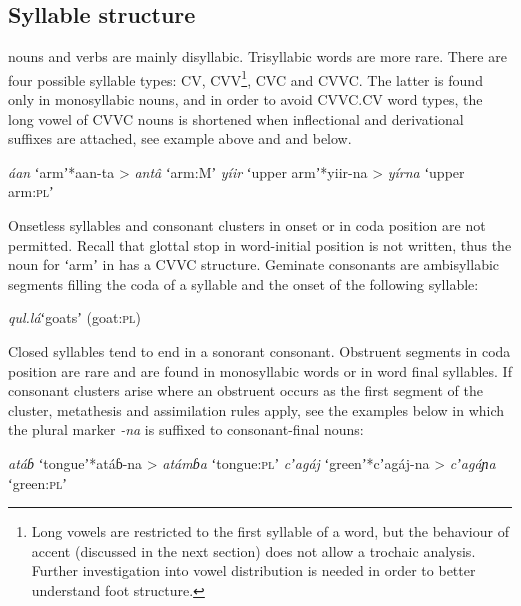 \documentclass[output=paper]{LSP/langsci}
\begin{document}
\subsection{Syllable structure} \label{sec:Petrollino:Syllablestructure}
 nouns and verbs are mainly disyllabic. Trisyllabic words are more rare. There are four possible syllable types: CV, CVV\footnote{Long vowels are restricted to the first syllable of a word, but the behaviour of accent (discussed in the next section) does not allow a trochaic analysis. Further investigation into vowel distribution is needed in order to better understand foot structure.}, CVC and CVVC. The latter is found only in monosyllabic nouns, and in order to avoid CVVC.CV word types, the long vowel of CVVC nouns is shortened when inflectional and derivational suffixes are attached, see example  above and  and  below.
\begin{exe}
	\ex \textit{áan}\hspace{9mm} ʻarmʼ\hspace{15mm}*aan-ta >\hspace{8mm} \textit{antâ}\hspace{8mm} ʻarm:Mʼ \label{ex:Petrollino:arm}
    \ex \textit{yíir}\hspace{9mm} ʻupper armʼ\hspace{5mm}*yiir-na >\hspace{7mm} \textit{yírna}\hspace{7mm} ʻupper arm:\textsc{pl}ʼ \label{ex:Petrollino:yiir}
\end{exe}
Onsetless syllables and consonant clusters in onset or in coda position are not permitted. Recall that glottal stop in word-initial position is not written, thus the noun for ʻarmʼ in  has a CVVC structure. Geminate consonants are ambisyllabic segments filling the coda of a syllable and the onset of the following syllable:
\begin{exe}
	\ex \textit{qul.lá}\hspace{8mm}ʻgoatsʼ (goat:\textsc{pl}) \label{ex:Petrollino:qul.lá}
\end{exe}
Closed syllables tend to end in a sonorant consonant. Obstruent segments in coda position are rare and are found in monosyllabic words or in word final syllables. If consonant clusters arise where an obstruent occurs as the first segment of the cluster, metathesis and assimilation rules apply, see the examples below in which the plural marker \textit{-na} is suffixed to consonant-final nouns:  
\begin{exe}
	\ex \textit{atáɓ}\hspace{9mm} ʻtongueʼ\hspace{10mm}*atáɓ-na >\hspace{6mm} \textit{atámɓa}\hspace{4mm} ʻtongue:\textsc{pl}ʼ
    \ex \textit{cʼagáj}\hspace{7mm} ʻgreenʼ\hspace{12mm}*cʼagáj-na >\hspace{4mm} \textit{cʼagáɲa}\hspace{4mm} ʻgreen:\textsc{pl}ʼ
\end{exe}
\end{document}
